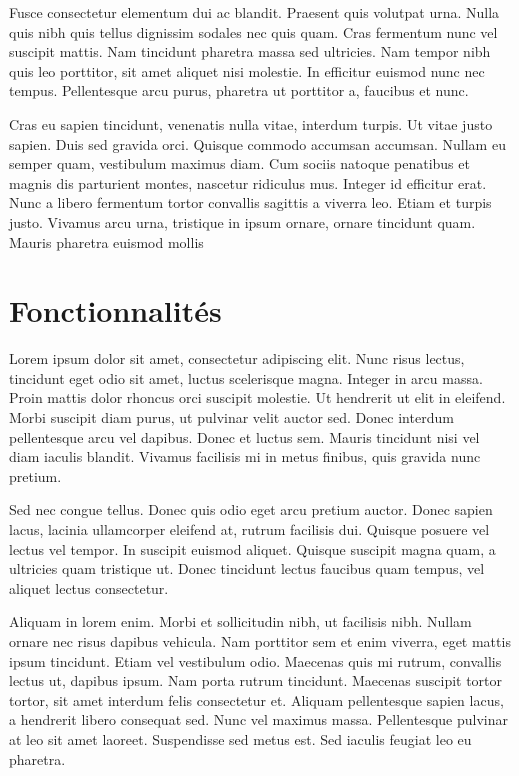 \documentclass{report}
\begin{document}
            Fusce consectetur elementum dui ac blandit. Praesent quis volutpat urna. Nulla quis nibh quis tellus dignissim sodales nec quis quam. Cras fermentum nunc vel suscipit mattis. Nam tincidunt pharetra massa sed ultricies. Nam tempor nibh quis leo porttitor, sit amet aliquet nisi molestie. In efficitur euismod nunc nec tempus. Pellentesque arcu purus, pharetra ut porttitor a, faucibus et nunc.

            Cras eu sapien tincidunt, venenatis nulla vitae, interdum turpis. Ut vitae justo sapien. Duis sed gravida orci. Quisque commodo accumsan accumsan. Nullam eu semper quam, vestibulum maximus diam. Cum sociis natoque penatibus et magnis dis parturient montes, nascetur ridiculus mus. Integer id efficitur erat. Nunc a libero fermentum tortor convallis sagittis a viverra leo. Etiam et turpis justo. Vivamus arcu urna, tristique in ipsum ornare, ornare tincidunt quam. Mauris pharetra euismod mollis


        \section{Fonctionnalités}
            Lorem ipsum dolor sit amet, consectetur adipiscing elit. Nunc risus lectus, tincidunt eget odio sit amet, luctus scelerisque magna. Integer in arcu massa. Proin mattis dolor rhoncus orci suscipit molestie. Ut hendrerit ut elit in eleifend. Morbi suscipit diam purus, ut pulvinar velit auctor sed. Donec interdum pellentesque arcu vel dapibus. Donec et luctus sem. Mauris tincidunt nisi vel diam iaculis blandit. Vivamus facilisis mi in metus finibus, quis gravida nunc pretium.

            Sed nec congue tellus. Donec quis odio eget arcu pretium auctor. Donec sapien lacus, lacinia ullamcorper eleifend at, rutrum facilisis dui. Quisque posuere vel lectus vel tempor. In suscipit euismod aliquet. Quisque suscipit magna quam, a ultricies quam tristique ut. Donec tincidunt lectus faucibus quam tempus, vel aliquet lectus consectetur.

            Aliquam in lorem enim. Morbi et sollicitudin nibh, ut facilisis nibh. Nullam ornare nec risus dapibus vehicula. Nam porttitor sem et enim viverra, eget mattis ipsum tincidunt. Etiam vel vestibulum odio. Maecenas quis mi rutrum, convallis lectus ut, dapibus ipsum. Nam porta rutrum tincidunt. Maecenas suscipit tortor tortor, sit amet interdum felis consectetur et. Aliquam pellentesque sapien lacus, a hendrerit libero consequat sed. Nunc vel maximus massa. Pellentesque pulvinar at leo sit amet laoreet. Suspendisse sed metus est. Sed iaculis feugiat leo eu pharetra.
\end{document}
